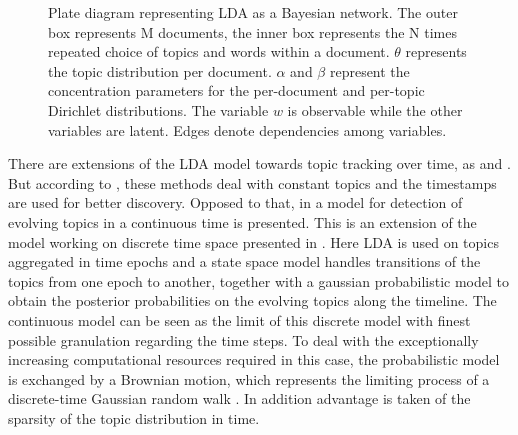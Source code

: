\begin{figure}[htp]
  \centering
  \caption{Plate diagram representing LDA as a Bayesian network. The outer box represents M documents, the inner box represents the N times repeated choice of topics and words within a document. $\theta$ represents the topic distribution per document. $\alpha$ and $\beta$ represent the concentration parameters for the per-document and per-topic Dirichlet distributions. The variable $w$ is observable while the other variables are latent. Edges denote dependencies among variables. \cite{Blei:2003:LDA:944919.944937} }
  \label{fig:lda}
\end{figure}

There are extensions of the LDA model towards topic tracking over time, as \cite{Wang:2006:TOT:1150402.1150450} and \cite{conf:ijcai:WeiSW07}. But according to \cite{conf:uai:WangBH08}, these methods deal with constant topics and the timestamps are used for better discovery. Opposed to that, in \cite{conf:uai:WangBH08} a model for detection of evolving topics in a continuous time is presented. This is an extension of the model working on discrete time space presented in \cite{Blei:2006:DTM:1143844.1143859}. Here LDA is used on topics aggregated in time epochs and a state space model handles transitions of the topics from one epoch to another, together with a gaussian probabilistic model to obtain the posterior probabilities on the evolving topics along the timeline. The continuous model can be seen as the limit of this discrete model with finest possible granulation regarding the time steps. To deal with the exceptionally increasing computational resources required in this case, the probabilistic model is exchanged by a Brownian motion, which represents the limiting process of a discrete-time Gaussian random walk \cite{Blei:2006:DTM:1143844.1143859}. In addition advantage is taken of the sparsity of the topic distribution in time.



